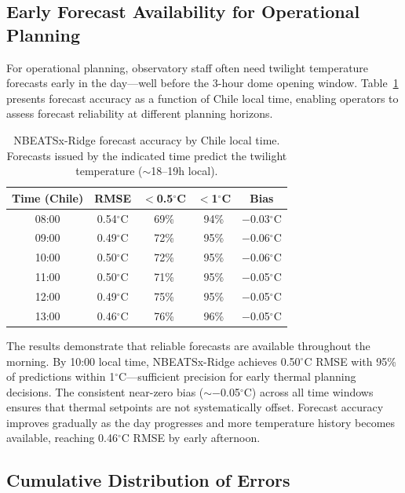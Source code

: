 \documentclass[twocolumn]{aastex631}
\begin{document}
\subsection{Early Forecast Availability for Operational Planning}
\label{sec:results:morning}

For operational planning, observatory staff often need twilight temperature forecasts early in the day---well before the 3-hour dome opening window. Table~\ref{tab:morning_forecasts} presents forecast accuracy as a function of Chile local time, enabling operators to assess forecast reliability at different planning horizons.

\begin{table}[htb!]
\centering
\small
\caption{NBEATSx-Ridge forecast accuracy by Chile local time. Forecasts issued by the indicated time predict the twilight temperature ($\sim$18--19h local).}
\label{tab:morning_forecasts}
\begin{tabular}{ccccc}
\toprule
Time (Chile) & RMSE & $<$0.5$^\circ$C & $<$1$^\circ$C & Bias \\
\midrule
08:00 & 0.54$^\circ$C & 69\% & 94\% & $-$0.03$^\circ$C \\
09:00 & 0.49$^\circ$C & 72\% & 95\% & $-$0.06$^\circ$C \\
10:00 & 0.50$^\circ$C & 72\% & 95\% & $-$0.06$^\circ$C \\
11:00 & 0.50$^\circ$C & 71\% & 95\% & $-$0.05$^\circ$C \\
12:00 & 0.49$^\circ$C & 75\% & 95\% & $-$0.05$^\circ$C \\
13:00 & 0.46$^\circ$C & 76\% & 96\% & $-$0.05$^\circ$C \\
\bottomrule
\end{tabular}
\end{table}

The results demonstrate that reliable forecasts are available throughout the morning. By 10:00 local time, NBEATSx-Ridge achieves 0.50$^\circ$C RMSE with 95\% of predictions within 1$^\circ$C---sufficient precision for early thermal planning decisions. The consistent near-zero bias ($\sim$$-$0.05$^\circ$C) across all time windows ensures that thermal setpoints are not systematically offset. Forecast accuracy improves gradually as the day progresses and more temperature history becomes available, reaching 0.46$^\circ$C RMSE by early afternoon.

\subsection{Cumulative Distribution of Errors}
\end{document}
